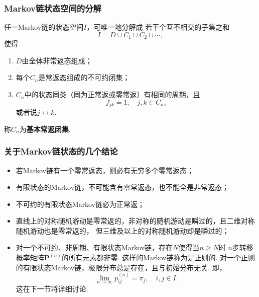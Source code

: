\begin{frame}
    \frametitle{Markov链状态空间的分解}
    \begin{mytheorem}
        任一Markov链的状态空间$I$，可唯一地分解成
        若干个互不相交的子集之和
        \begin{equation*}
            I=D\cup C_1\cup C_2\cup\cdots,
        \end{equation*}
        使得
        \begin{enumerate}
            \item $D$由全体非常返态组成；
            \item 每个$C_n$是常返态组成的不可约闭集；
            \item $C_n$中的状态同类（同为正常返或零常返）有相同的周期，且
            \begin{equation*}
                f_{jk}=1,\quad j,k\in C_n,
            \end{equation*}或者说$j\leftrightarrow k$. 
        \end{enumerate}
        称$C_n$为\textbf{基本常返闭集}.
    \end{mytheorem}
\end{frame}

\begin{frame}
    \frametitle{关于Markov链状态的几个结论}
    \begin{myproposition}
        \begin{itemize}
            \item 若Markov链有一个零常返态，则必有无穷多个零常返态；
            \item 有限状态的Markov链，不可能含有零常返态，也不能全是非常返态；
            \item 不可约的有限状态Markov链必为正常返；
            \item 直线上的对称随机游动是零常返的，非对称的随机游动是瞬过的，且二维对称随机游动也是零常返的，
            但三维及以上的对称随机游动却是瞬过的；
            \item 对一个不可约、非周期、有限状态Markov链，存在$N$使得当$n\geqslant N$时
            $n$步转移概率矩阵$\bm P^{(n)}$的所有元素都非零. 这样的Markov链称为是正则的. 
            对一个正则的有限状态Markov链，极限分布总是存在，且与初始分布无关. 即，
            \begin{equation*}
                \lim_{n\to\infty}p_{ij}^{(n)}=\pi_j,\quad i,j\in I.
            \end{equation*}
            这在下一节将详细讨论. 
        \end{itemize}
    \end{myproposition}
\end{frame}

